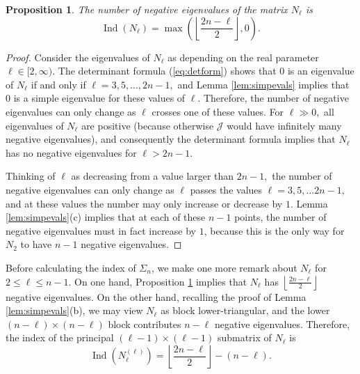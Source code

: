 \documentclass[11pt]{article}
\newtheorem{prop}[thm]{Proposition}
\theoremstyle{definition}
\numberwithin{equation}{section}
\begin{document}
\begin{prop}\label{prop:negevalcount}
    The number of negative eigenvalues of the matrix $N_\ell$ is
    \begin{equation*}
        \operatorname{Ind}(N_\ell) = \operatorname{max} \left( \left\lfloor \frac{2n - \ell}{2} \right\rfloor , 0 \right)\!.
    \end{equation*}
\end{prop}

\begin{proof}
    Consider the eigenvalues of $N_\ell$ as depending on the real parameter $\ell \in [2,\infty)$. The determinant formula (\ref{eq:detform}) shows that $0$ is an eigenvalue of $N_\ell$ if and only if $\ell = 3, 5, \ldots, 2n-1,$ and Lemma \ref{lem:simpevals} implies that $0$ is a simple eigenvalue for these values of $\ell$. Therefore, the number of negative eigenvalues can only change as $\ell$ crosses one of these values. For $\ell \gg 0,$ all eigenvalues of $N_\ell$ are positive (because otherwise $\mathscr{J}$ would have infinitely many negative eigenvalues), and consequently the determinant formula implies that $N_\ell$ has no negative eigenvalues for $\ell > 2n-1.$ 
    
    Thinking of $\ell$ as decreasing from a value larger than $2n-1,$ the number of negative eigenvalues can only change as $\ell$ passes the values $\ell = 3, 5, \ldots 2n-1,$ and at these values the number may only increase or decrease by $1$. Lemma \ref{lem:simpevals}(c) implies that at each of these $n-1$ points, the number of negative eigenvalues must in fact increase by $1$, because this is the only way for $N_{2}$ to have $n-1$ negative eigenvalues.
\end{proof}

\indent Before calculating the index of $\Sigma_n$, we make one more remark about $N_\ell$ for $2 \leq \ell \leq n-1$.  On one hand, Proposition \ref{prop:negevalcount} implies that $N_\ell$ has $\left\lfloor \frac{2n-\ell}{2} \right\rfloor$ negative eigenvalues.  On the other hand, recalling the proof of Lemma \ref{lem:simpevals}(b), we may view $N_\ell$ as block lower-triangular, and the lower $(n-\ell) \times (n-\ell)$ block contributes $n - \ell$ negative eigenvalues.  Therefore, the index of the principal $(\ell - 1) \times (\ell - 1)$ submatrix of $N_\ell$ is  
\begin{equation}\label{eq:submatrixindex}
    \operatorname{Ind}(N_\ell^{(\ell)}) = \left\lfloor \frac{2n-\ell}{2} \right\rfloor - (n - \ell).
\end{equation}
\end{document}

